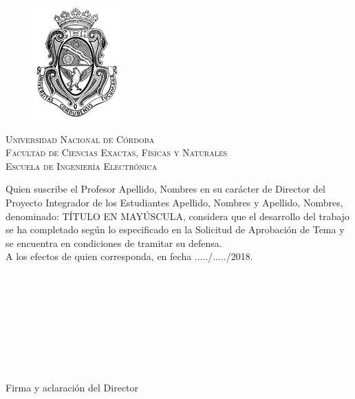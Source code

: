 \documentclass[12pt,A4paper,titlepage, twoside, openright]{report}
\begin{document}


\newpage
\begin{center}
	
	\begin{figure}[h]
		\begin{center}
			\includegraphics[scale=0.8]{logo_unc.png}
		\end{center}
	\end{figure}
	\vspace{0.25em}
	
	\textsc{\LARGE Universidad Nacional de Córdoba}\\[0.3cm] %
	\textsc{\large Facultad de Ciencias Exactas, Físicas y Naturales}\\[0.3cm] %
	\textsc{\large Escuela de Ingeniería Electrónica}\\[0.75cm] %
\end{center}

Quien suscribe el Profesor Apellido, Nombres en su carácter de Director del Proyecto Integrador de los Estudiantes Apellido, Nombres y Apellido, Nombres, denominado: TÍTULO EN MAYÚSCULA, considera que el desarrollo del trabajo se ha completado según lo especificado en la Solicitud de Aprobación de Tema y se encuentra en condiciones de tramitar su defensa.
\\

A los efectos de quien corresponda, en fecha ...../...../2018.
\\
\\
\\
\\
\\
\\
\\
\\
\\

\begin{flushright}
Firma y aclaración del Director
\end{flushright} 
\end{document}
